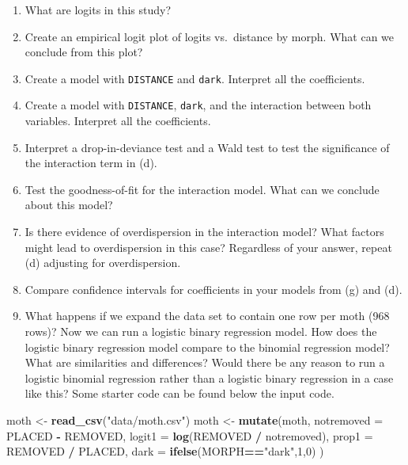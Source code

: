 \documentclass[
]{krantz}
\newenvironment{Shaded}{\begin{snugshade}}{\end{snugshade}}
\newcommand{\DataTypeTok}[1]{\textcolor[rgb]{0.27,0.27,0.27}{#1}}
\newcommand{\DecValTok}[1]{\textcolor[rgb]{0.06,0.06,0.06}{#1}}
\newcommand{\KeywordTok}[1]{\textcolor[rgb]{0.27,0.27,0.27}{\textbf{#1}}}
\newcommand{\NormalTok}[1]{#1}
\newcommand{\OperatorTok}[1]{\textcolor[rgb]{0.43,0.43,0.43}{\textbf{#1}}}
\newcommand{\StringTok}[1]{\textcolor[rgb]{0.5,0.5,0.5}{#1}}
\providecommand{\tightlist}{%
  \setlength{\itemsep}{0pt}\setlength{\parskip}{0pt}}
\begin{document}
\begin{enumerate}
  \begin{enumerate}
  \def\labelenumii{\alph{enumii}.}
  \tightlist
  \item
    What are logits in this study?
  \item
    Create an empirical logit plot of logits vs.~distance by morph. What can we conclude from this plot?
  \item
    Create a model with \texttt{DISTANCE} and \texttt{dark}. Interpret all the coefficients.
  \item
    Create a model with \texttt{DISTANCE}, \texttt{dark}, and the interaction between both variables. Interpret all the coefficients.
  \item
    Interpret a drop-in-deviance test and a Wald test to test the significance of the interaction term in (d).
  \item
    Test the goodness-of-fit for the interaction model. What can we conclude about this model?
  \item
    Is there evidence of overdispersion in the interaction model? What factors might lead to overdispersion in this case? Regardless of your answer, repeat (d) adjusting for overdispersion.
  \item
    Compare confidence intervals for coefficients in your models from (g) and (d).
  \item
    What happens if we expand the data set to contain one row per moth (968 rows)? Now we can run a logistic binary regression model. How does the logistic binary regression model compare to the binomial regression model? What are similarities and differences? Would there be any reason to run a logistic binomial regression rather than a logistic binary regression in a case like this? Some starter code can be found below the input code.
  \end{enumerate}
\end{enumerate}

\begin{Shaded}
\begin{Highlighting}[]
\NormalTok{moth <-}\StringTok{ }\KeywordTok{read_csv}\NormalTok{(}\StringTok{"data/moth.csv"}\NormalTok{)}
\NormalTok{moth <-}\StringTok{ }\KeywordTok{mutate}\NormalTok{(moth, }
               \DataTypeTok{notremoved =}\NormalTok{ PLACED }\OperatorTok{-}\StringTok{ }\NormalTok{REMOVED, }
               \DataTypeTok{logit1 =} \KeywordTok{log}\NormalTok{(REMOVED }\OperatorTok{/}\StringTok{ }\NormalTok{notremoved),}
               \DataTypeTok{prop1 =}\NormalTok{ REMOVED }\OperatorTok{/}\StringTok{ }\NormalTok{PLACED, }
               \DataTypeTok{dark =} \KeywordTok{ifelse}\NormalTok{(MORPH}\OperatorTok{==}\StringTok{"dark"}\NormalTok{,}\DecValTok{1}\NormalTok{,}\DecValTok{0}\NormalTok{) )}
\end{Highlighting}
\end{Shaded}
\end{document}
